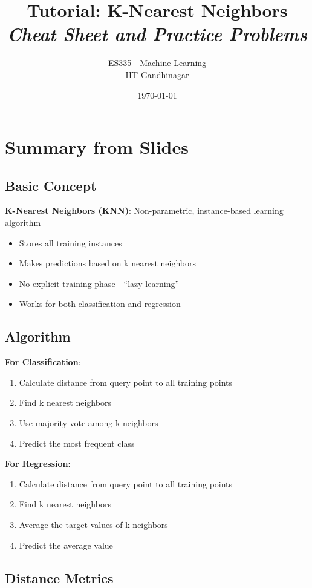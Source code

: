 \documentclass{article}
\title{\textbf{Tutorial: K-Nearest Neighbors} \\ \textit{Cheat Sheet and Practice Problems}}
\author{ES335 - Machine Learning \\ IIT Gandhinagar}
\date{\today}
\begin{document}
\maketitle

\section{Summary from Slides}

\subsection{Basic Concept}

\textbf{K-Nearest Neighbors (KNN)}: Non-parametric, instance-based learning algorithm
\begin{itemize}
    \item Stores all training instances
    \item Makes predictions based on k nearest neighbors
    \item No explicit training phase - ``lazy learning''
    \item Works for both classification and regression
\end{itemize}

\subsection{Algorithm}

\textbf{For Classification}:
\begin{enumerate}
    \item Calculate distance from query point to all training points
    \item Find k nearest neighbors
    \item Use majority vote among k neighbors
    \item Predict the most frequent class
\end{enumerate}

\textbf{For Regression}:
\begin{enumerate}
    \item Calculate distance from query point to all training points
    \item Find k nearest neighbors
    \item Average the target values of k neighbors
    \item Predict the average value
\end{enumerate}

\subsection{Distance Metrics}
\end{document}
